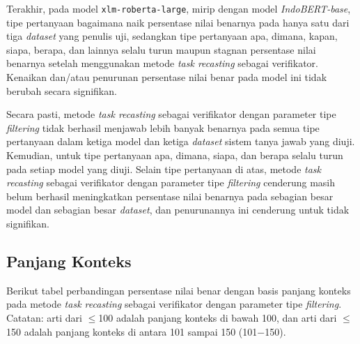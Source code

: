 Terakhir, pada model \texttt{xlm-roberta-large}, mirip dengan model \emph{IndoBERT-base}, tipe pertanyaan bagaimana naik persentase nilai benarnya pada hanya satu dari tiga \emph{dataset} yang penulis uji, sedangkan tipe pertanyaan apa, dimana, kapan, siapa, berapa, dan lainnya selalu turun maupun stagnan persentase nilai benarnya setelah menggunakan metode \emph{task recasting} sebagai verifikator. Kenaikan dan/atau penurunan persentase nilai benar pada model ini tidak berubah secara signifikan.

Secara pasti, metode \emph{task recasting} sebagai verifikator dengan parameter tipe \emph{filtering} tidak berhasil menjawab lebih banyak benarnya pada semua tipe pertanyaan dalam ketiga model dan ketiga \emph{dataset} sistem tanya jawab yang diuji. Kemudian, untuk tipe pertanyaan apa, dimana, siapa, dan berapa selalu turun pada setiap model yang diuji. Selain tipe pertanyaan di atas, metode \emph{task recasting} sebagai verifikator dengan parameter tipe \emph{filtering} cenderung masih belum berhasil meningkatkan persentase nilai benarnya pada sebagian besar model dan sebagian besar \emph{dataset}, dan penurunannya ini cenderung untuk tidak signifikan.

\subsection{Panjang Konteks}
Berikut tabel perbandingan persentase nilai benar dengan basis panjang konteks pada metode \emph{task recasting} sebagai verifikator dengan parameter tipe \emph{filtering}. Catatan: arti dari $\leq$100 adalah panjang konteks di bawah 100, dan arti dari $\leq$150 adalah panjang konteks di antara 101 sampai 150 (101$-$150).


